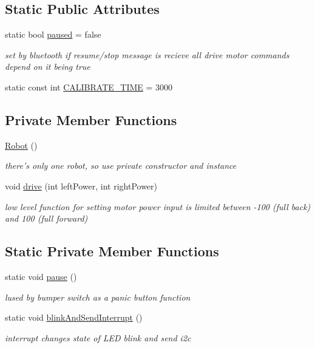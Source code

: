 \subsection*{Static Public Attributes}
\begin{DoxyCompactItemize}
\item 
static bool \hyperlink{classRobot_a6a1fae6e6ee0a3298b9e60d3f50ad12a}{paused} = false
\begin{DoxyCompactList}\small\item\em set by bluetooth if resume/stop message is recieve all drive motor commands depend on it being true \end{DoxyCompactList}\item 
static const int \hyperlink{classRobot_ac40abfa06749a68604af90c00e2a3fee}{C\-A\-L\-I\-B\-R\-A\-T\-E\-\_\-\-T\-I\-M\-E} = 3000
\end{DoxyCompactItemize}
\subsection*{Private Member Functions}
\begin{DoxyCompactItemize}
\item 
\hyperlink{classRobot_a4fc7c70ae20623f05e06f2ecb388b6c4}{Robot} ()
\begin{DoxyCompactList}\small\item\em there's only one robot, so use private constructor and instance \end{DoxyCompactList}\item 
void \hyperlink{classRobot_aad8723ec56e9fc8ca17da5ef79de37d6}{drive} (int left\-Power, int right\-Power)
\begin{DoxyCompactList}\small\item\em low level function for setting motor power input is limited between -\/100 (full back) and 100 (full forward) \end{DoxyCompactList}\end{DoxyCompactItemize}
\subsection*{Static Private Member Functions}
\begin{DoxyCompactItemize}
\item 
static void \hyperlink{classRobot_a9908dfe5a06008e6203edca94d30327a}{pause} ()
\begin{DoxyCompactList}\small\item\em lused by bumper switch as a panic button function \end{DoxyCompactList}\item 
static void \hyperlink{classRobot_afb5418d31b61a64e0930fd1fb495c8c9}{blink\-And\-Send\-Interrupt} ()
\begin{DoxyCompactList}\small\item\em interrupt changes state of L\-E\-D blink and send i2c \end{DoxyCompactList}\end{DoxyCompactItemize}
